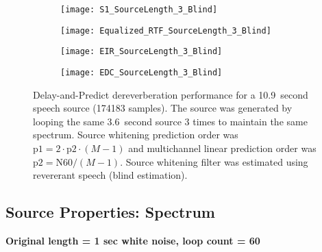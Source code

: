 \begin{figure}[H]
	\centering
	\begin{subfigure}[b]{0.49\textwidth}
		\centering
		\texttt{[image: S1\_SourceLength\_3\_Blind]}
	\end{subfigure}
	\hfill
	\begin{subfigure}[b]{0.49\textwidth}
		\centering
		\texttt{[image: Equalized\_RTF\_SourceLength\_3\_Blind]}
	\end{subfigure}
	\hfill
	\begin{subfigure}[b]{0.49\textwidth}
		\centering
		\texttt{[image: EIR\_SourceLength\_3\_Blind]}
	\end{subfigure}
	\hfill
	\begin{subfigure}[b]{0.49\textwidth}
		\centering
		\texttt{[image: EDC\_SourceLength\_3\_Blind]}
	\end{subfigure}
	\hfill
	\caption{Delay-and-Predict dereverberation performance for a \qty{10.9}{second} speech source (174183 samples). The source was generated by looping the same \qty{3.6}{second} source 3 times to maintain the same spectrum. Source whitening prediction order was $\mathrm{p1} = 2 \cdot \mathrm{p2} \cdot (M-1)$ and multichannel linear prediction order was $\mathrm{p2} = \mathrm{N60} / (M-1)$. Source whitening filter was estimated using revererant speech (blind estimation).}
	\label{fig:params_source_length_3_blind}
\end{figure}

\subsection{Source Properties: Spectrum}

\textbf{Original length = 1 sec white noise, loop count = 60}

